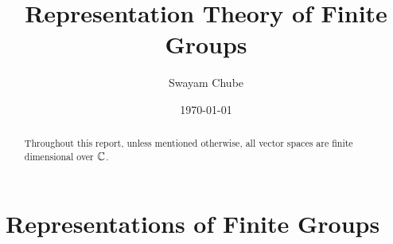 \documentclass[oneside]{report}
\title{Representation Theory of Finite Groups}
\author{Swayam Chube}
\date{\today}
\begin{document}
\maketitle
\tableofcontents

\begin{abstract}
    Throughout this report, unless mentioned otherwise, all vector spaces are finite dimensional over $\mathbb{C}$.
\end{abstract}

\chapter{Representations of Finite Groups}

\end{document}
